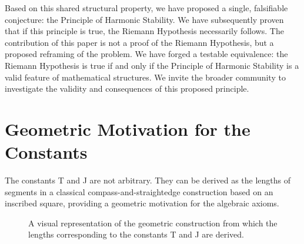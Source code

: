 \documentclass{amsart}
\theoremstyle{plain}
\theoremstyle{definition}
\theoremstyle{remark}
\begin{document}
Based on this shared structural property, we have proposed a single, falsifiable conjecture: the Principle of Harmonic Stability. We have subsequently proven that if this principle is true, the Riemann Hypothesis necessarily follows. The contribution of this paper is not a proof of the Riemann Hypothesis, but a proposed reframing of the problem. We have forged a testable equivalence: the Riemann Hypothesis is true if and only if the Principle of Harmonic Stability is a valid feature of mathematical structures. We invite the broader community to investigate the validity and consequences of this proposed principle.

\appendix
\section{Geometric Motivation for the Constants}
\label{app:A}
The constants T and J are not arbitrary. They can be derived as the lengths of segments in a classical compass-and-straightedge construction based on an inscribed square, providing a geometric motivation for the algebraic axioms.

\begin{figure}[htbp]
    \centering
    \caption{A visual representation of the geometric construction from which the lengths corresponding to the constants T and J are derived.}
    \label{fig:geometry}
\end{figure}
\end{document}
